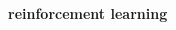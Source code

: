 \documentclass[xcolor=dvipsnames]{beamer}
\begin{document}
\begin{frame}{\bf reinforcement learning}
\begin{columns}
    \begin{column}{0.5\textwidth}
    \end{column}


  \end{columns}

\end{frame}
\end{document}
